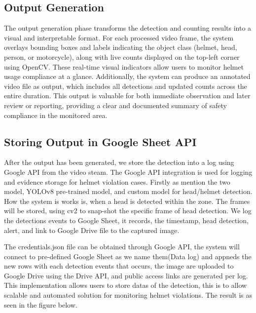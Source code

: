 \subsection{Output Generation}
\noindent\hspace{2.5em}The output generation phase transforms the detection and counting results into a visual and interpretable format. For each processed video frame, the system overlays bounding boxes and labels indicating the object class (helmet, head, person, or motorcycle), along with live counts displayed on the top-left corner using OpenCV. These real-time visual indicators allow users to monitor helmet usage compliance at a glance. Additionally, the system can produce an annotated video file as output, which includes all detections and updated counts across the entire duration. This output is valuable for both immediate observation and later review or reporting, providing a clear and documented summary of safety compliance in the monitored area.

\subsection{Storing Output in Google Sheet API}
\noindent\hspace{2.5em}After the output has been generated, we store the detection into a log using Google API from the video steam. The Google API integration is used for logging and evidence storage for helmet violation cases. Firstly as mention the two model, YOLOv8 pre-trained model, and custom model for head/helmet detection. How the system is works is, when a head is detected within the zone. The frames will be stored, using cv2 to snap-shot the specific frame of head detection. We log the detections events to Google Sheet, it records, the timestamp, head detection, alert, and link to Google Drive file to the captured image.


\noindent\hspace{2.5em}The credentials.json file can be obtained through Google API, the system will connect to pre-defined Google Sheet as we name them(Data log) and appneds the new rows with each detection events that occurs, the image are uploaded to Google Drive using the Drive API, and public access links are generated per log. This implementation allows users to store datas of the detection, this is to allow scalable and automated solution for monitoring helmet violations. The result is as seen in the figure below.

